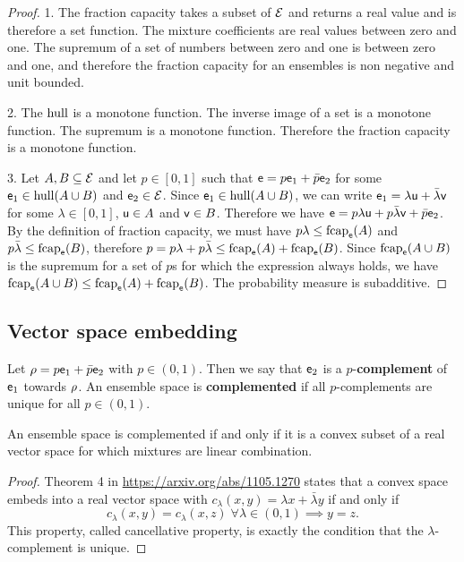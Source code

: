 \begin{proof}
	1. The fraction capacity takes a subset of $\Ens$ and returns a real value and is therefore a set function. The mixture coefficients are real values between zero and one. The supremum of a set of numbers between zero and one is between zero and one, and therefore the fraction capacity for an ensembles is non negative and unit bounded.
	
	2. The $\hull$ is a monotone function. The inverse image of a set is a monotone function. The supremum is a monotone function. Therefore the fraction capacity is a monotone function.
	
	3. Let $A, B \subseteq \Ens$ and let $p \in [0,1]$ such that $\ens = p \ens_1 + \bar{p} \ens_2$ for some $\ens_1 \in \hull(A \cup B)$ and $\ens_2 \in \Ens$. Since $\ens_1 \in \hull(A \cup B)$, we can write $\ens_1 = \lambda \ens[u] + \bar{\lambda} \ens[v]$ for some $\lambda \in [0,1]$, $\ens[u] \in A$ and $\ens[v] \in B$. Therefore we have $\ens = p \lambda \ens[u] + p \bar{\lambda} \ens[v] + \bar{p} \ens_2$. By the definition of fraction capacity, we must have $p\lambda \leq \fcap_{\ens}(A)$ and $p\bar{\lambda} \leq \fcap_{\ens}(B)$, therefore $p = p\lambda + p\bar{\lambda} \leq \fcap_{\ens}(A) + \fcap_{\ens}(B)$. 	Since $\fcap_{\ens}(A \cup B)$ is the supremum for a set of $p$s for which the expression always holds, we have $\fcap_{\ens}(A \cup B) \leq \fcap_{\ens}(A) + \fcap_{\ens}(B)$. The probability measure is subadditive.
\end{proof}

\subsection{Vector space embedding}

\begin{defn}
	 Let $\ens[\rho] = p \ens_1 + \bar{p} \ens_2$ with $p \in (0,1)$. Then we say that $\ens_2$ is a $p$-\textbf{complement} of $\ens_1$ towards $\ens[\rho]$. An ensemble space is \textbf{complemented} if all $p$-complements are unique for all $p \in (0, 1)$.
\end{defn}

\begin{prop}\label{pm_es_complementedIsVectorSpace}
	An ensemble space is complemented if and only if it is a convex subset of a real vector space for which mixtures are linear combination.
\end{prop}

\begin{proof}
	Theorem 4 in \url{https://arxiv.org/abs/1105.1270} states that a convex space embeds into a real vector space with $c_\lambda(x,y) = \lambda x + \bar{\lambda}y$ if and only if
	$$ c_\lambda(x,y) = c_\lambda(x,z) \; \forall \lambda \in (0,1) \implies y = z.$$ This property, called cancellative property, is exactly the condition that the $\lambda$-complement is unique.
\end{proof}

